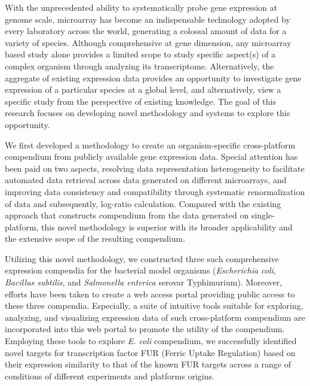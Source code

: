 With the unprecedented ability to systematically probe gene expression
at genome scale, microarray has become an indispensable technology
adopted by every laboratory across the world, generating a colossal
amount of data for a variety of species.
%
Although comprehensive at gene dimension, any microarray based study
alone provides a limited scope to study specific aspect(s) of a
complex organism through analyzing its transcriptome.
%
Alternatively, the aggregate of existing expression data provides an
opportunity to investigate gene expression of a particular species at
a global level, and alternatively, view a specific study from the
perspective of existing knowledge.
%
The goal of this research focuses on developing novel methodology and
systems to explore this opportunity.
%



We first developed a methodology to create an organism-specific
cross-platform compendium from publicly available gene expression data.
%
Special attention has been paid on two aspects, resolving data
representation heterogeneity to facilitate automated data retrieval
across data generated on different microarrays, and improving data
consistency and compatibility through systematic renormalization of data
and subsequently, log-ratio calculation.
%
%
Compared with the existing approach that constructs compendium from
the data generated on single-platform, this novel methodology is
superior with its broader applicability and the extensive scope of the
resulting compendium.


Utilizing this novel methodology, we constructed three such
comprehensive expression compendia for the bacterial model organisms
(\textit{Escherichia coli}, \textit{Bacillus subtilis}, and
\textit{Salmonella enterica} serovar Typhimurium).
%
Moreover, efforts have been taken to create a web access portal
providing public access to these three compendia.
%
Especially, a suite of intuitive tools suitable for exploring,
analyzing, and visualizing expression data of such cross-platform
compendium are incorporated into this web portal to promote the utility
of the compendium.
%
Employing these tools to explore \textit{E. coli} compendium, we
successfully identified novel targets for transcription factor FUR
(Ferric Uptake Regulation) based on their expression similarity to that
of the known FUR targets across a range of conditions of different
experiments and platforms origins.
%


